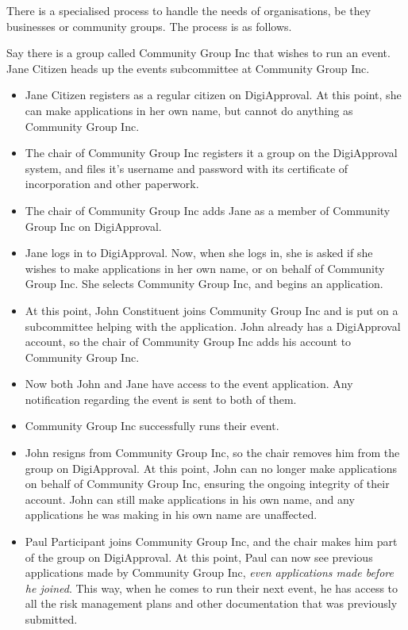 \documentclass[12pt,a4paper,twosided]{article}
\begin{document}
There is a specialised process to handle the needs of organisations, be they businesses or community groups. The process is as follows.

Say there is a group called Community Group Inc that wishes to run an event. Jane Citizen heads up the events subcommittee at Community Group Inc.

\begin{itemize}
\item Jane Citizen registers as a regular citizen on DigiApproval. At this point, she can make applications in her own name, but cannot do anything as Community Group Inc.
\item The chair of Community Group Inc registers it a group on the DigiApproval system, and files it's username and password with its certificate of incorporation and other paperwork.
\item The chair of Community Group Inc adds Jane as a member of Community Group Inc on DigiApproval.
\item Jane logs in to DigiApproval. Now, when she logs in, she is asked if she wishes to make applications in her own name, or on behalf of Community Group Inc. She selects Community Group Inc, and begins an application.
\item At this point, John Constituent joins Community Group Inc and is put on a subcommittee helping with the application. John already has a DigiApproval account, so the chair of Community Group Inc adds his account to Community Group Inc.
\item Now both John and Jane have access to the event application. Any notification regarding the event is sent to both of them.
\item Community Group Inc successfully runs their event.
\item John resigns from Community Group Inc, so the chair removes him from the group on DigiApproval. At this point, John can no longer make applications on behalf of Community Group Inc, ensuring the ongoing integrity of their account. John can still make applications in his own name, and any applications he was making in his own name are unaffected.
\item Paul Participant joins Community Group Inc, and the chair makes him part of the group on DigiApproval. At this point, Paul can now see previous applications made by Community Group Inc, \emph{even applications made before he joined}. This way, when he comes to run their next event, he has access to all the risk management plans and other documentation that was previously submitted.
\end{itemize}
\end{document}
